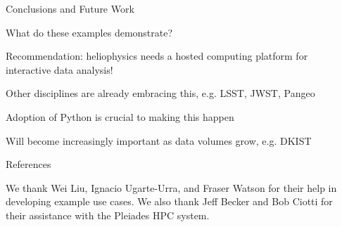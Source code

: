 \documentclass[final,12pt]{beamer}
\newlength{\sepwidth}
\newlength{\colwidth}
\newcommand{\separatorcolumn}{\begin{column}{\sepwidth}\end{column}}
\begin{document}
\begin{frame}[fragile,t]
\begin{columns}[t]
\begin{column}{\colwidth}
  \begin{block}{Conclusions and Future Work}

    What do these examples demonstrate?

    Recommendation: heliophysics needs a hosted computing platform for interactive data analysis!

    Other disciplines are already embracing this, e.g. LSST, JWST, Pangeo

    Adoption of Python is crucial to making this happen 

    Will become increasingly important as data volumes grow, e.g. DKIST

  \end{block}

  \begin{block}{References}
    \scriptsize

    We thank Wei Liu, Ignacio Ugarte-Urra, and Fraser Watson for their help in developing example use cases. We also thank Jeff Becker and Bob Ciotti for their assistance with the Pleiades HPC system. 

      \begin{multicols}{2}
        
        
      \end{multicols}

  \end{block}

\end{column}

\separatorcolumn
\end{columns}
\end{frame}
\end{document}
